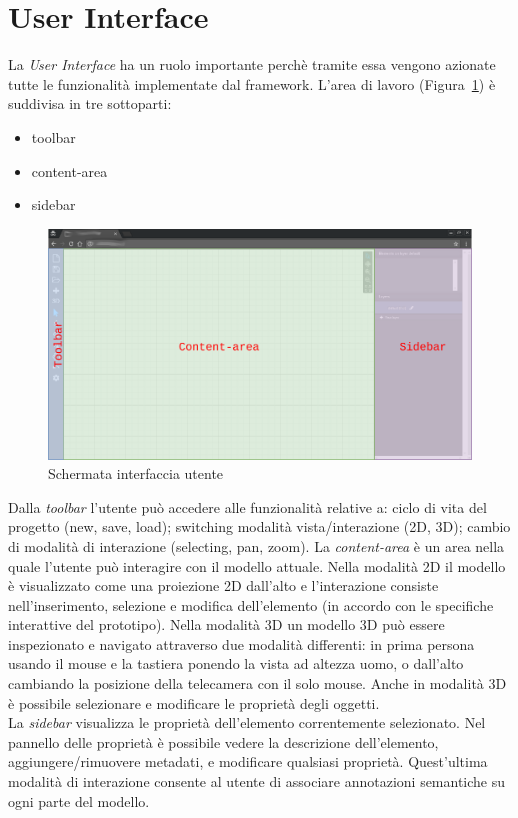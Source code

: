 \section{User Interface}
\label{sec:chapter_2_section_2}

La \emph{User Interface} ha un ruolo importante perchè tramite essa vengono azionate tutte le funzionalità
implementate dal framework. L'area di lavoro (Figura~\ref{fig:interfaccia}) è suddivisa in tre sottoparti:
\begin{itemize}
  \item toolbar
  \item content-area
  \item sidebar
\end{itemize}

\begin{figure}[htbp] %
   \centering
   \includegraphics[width=1\linewidth]{images/mock-interfaccia}
   \caption{Schermata interfaccia utente}
   \label{fig:interfaccia}
\end{figure}

Dalla \emph{toolbar} l'utente pu\`o accedere alle funzionalit\`a relative a: ciclo di vita del progetto (new, save, load);
switching modalità vista/interazione (2D, 3D); cambio di modalità di interazione (selecting, pan, zoom).
\newpage
La \emph{content-area} \`e un area nella quale l'utente pu\`o interagire con il modello attuale. Nella modalit\`a 2D
il modello \`e visualizzato come una proiezione 2D dall'alto e l'interazione consiste nell'inserimento, selezione e modifica
dell'elemento (in accordo con le specifiche interattive del prototipo). Nella modalità 3D un modello 3D pu\`o essere
inspezionato e navigato attraverso due modalità differenti: in prima persona usando il mouse e la tastiera ponendo la vista
ad altezza uomo, o dall'alto cambiando la posizione della telecamera con il solo mouse. Anche in modalità 3D è possibile
selezionare e modificare le proprietà degli oggetti.\\
La \emph{sidebar} visualizza le propriet\`a dell'elemento correntemente selezionato. Nel pannello delle propriet\`a \`e possibile
vedere la descrizione dell'elemento, aggiungere/rimuovere metadati, e modificare qualsiasi propriet\`a.
Quest'ultima modalità di interazione consente al utente di associare annotazioni semantiche su ogni parte del modello.
\newpage


